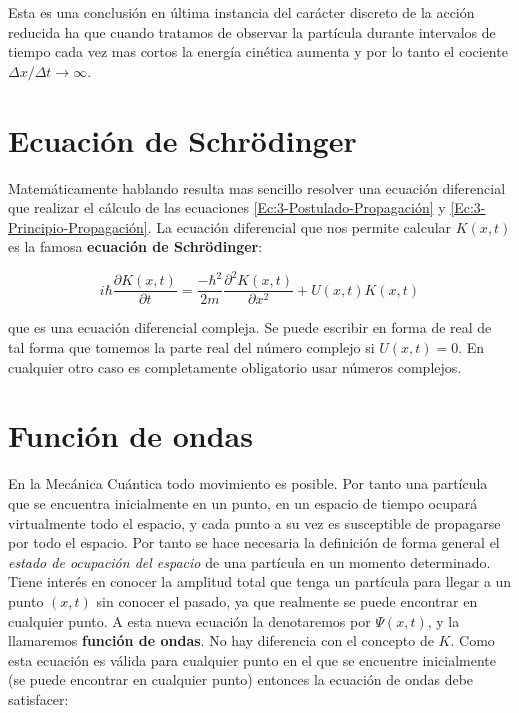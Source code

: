 \documentclass[12pt,a4paper]{article}
\numberwithin{equation}{section}
\numberwithin{figure}{section}
\newcommand{\parciales}[2]{\frac{\partial #1}{\partial #2}}
\begin{document}
Esta es una conclusión en última instancia del carácter discreto de la acción reducida ha que cuando tratamos de observar la partícula durante intervalos de tiempo cada vez mas cortos la energía cinética aumenta y por lo tanto el cociente $\Delta x / \Delta t \rightarrow \infty$. 

\section{Ecuación de Schrödinger}

Matemáticamente hablando resulta mas sencillo resolver una ecuación diferencial que realizar el cálculo de las ecuaciones \ref{Ec:3-Postulado-Propagación} y \ref{Ec:3-Principio-Propagación}. La ecuación diferencial que nos permite calcular $K(x,t)$ es la famosa \textbf{ecuación de Schrödinger}:

\begin{equation}
i \hbar \parciales{K(x,t)}{t}  = \dfrac{- \hbar^2}{2 m} \parciales{^2 K(x,t)}{x^2} + U(x,t)K(x,t)
\end{equation}

que es una ecuación diferencial compleja. Se puede escribir en forma de real de tal forma que tomemos la parte real del número complejo si $U(x,t) = 0$. En cualquier otro caso es completamente obligatorio usar números complejos.


\section{Función de ondas}

En la Mecánica Cuántica todo movimiento es posible. Por tanto una partícula que se encuentra inicialmente en un punto, en un espacio de tiempo ocupará virtualmente todo el espacio, y cada punto a su vez es susceptible de propagarse por todo el espacio. Por tanto se hace necesaria la definición de forma general el \textit{estado de ocupación del espacio} de una partícula en un momento determinado. \\

Tiene interés en conocer la amplitud total que tenga un partícula para llegar a un punto $(x,t)$ sin conocer el pasado, ya que realmente se puede encontrar en cualquier punto. A esta nueva ecuación la denotaremos por $\Psi (x,t)$, y la llamaremos \textbf{función de ondas}. No hay diferencia con el concepto de $K$. Como esta ecuación es válida para cualquier punto en el que se encuentre inicialmente (se puede encontrar en cualquier punto) entonces la ecuación de ondas debe satisfacer:
\end{document}

